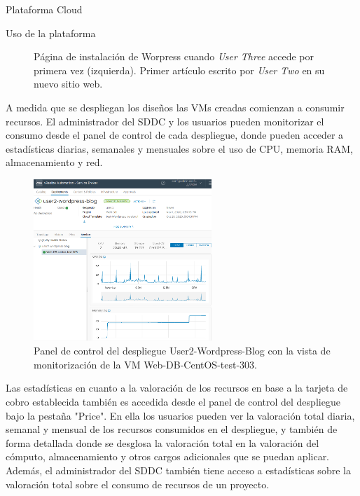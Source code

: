 \begin{subsection}{Plataforma Cloud}
\begin{subsubsection}{Uso de la plataforma}
\begin{figure}[h]
            \caption{Página de instalación de Worpress cuando \textit{User Three} accede por primera vez (izquierda). Primer artículo escrito por \textit{User Two} en su nuevo sitio web.}
            \label{fig:wordpress-user-2}
        \end{figure}
        \FloatBarrier
        A medida que se despliegan los diseños las VMs creadas comienzan a consumir recursos. El administrador del SDDC y los usuarios pueden monitorizar el consumo desde el panel de control de cada despliegue, donde pueden acceder a estadísticas diarias, semanales y mensuales sobre el uso de CPU, memoria RAM, almacenamiento y red.
        \begin{figure}[h]
            \centering
            \includegraphics[width=0.6\textwidth]{imaxes/pruebaconcepto/vrealize/statistics-service-broker.png}
            \caption{Panel de control del despliegue User2-Wordpress-Blog con la vista de monitorización de la VM Web-DB-CentOS-test-303.}
            \label{fig:statistics-user-2}
        \end{figure}
        \FloatBarrier
        Las estadísticas en cuanto a la valoración de los recursos en base a la tarjeta de cobro establecida también es accedida desde el panel de control del despliegue bajo la pestaña "Price". En ella los usuarios pueden ver la valoración total diaria, semanal y mensual de los recursos consumidos en el despliegue, y también de forma detallada donde se desglosa la valoración total en la valoración del cómputo, almacenamiento y otros cargos adicionales que se puedan aplicar. Además, el administrador del SDDC también tiene acceso a estadísticas sobre la valoración total sobre el consumo de recursos de un proyecto. 
        

\end{subsubsection}
\end{subsection}

